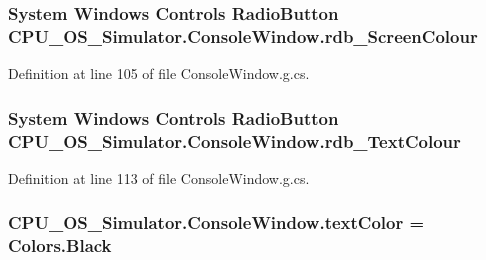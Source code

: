 \subsubsection[{rdb\+\_\+\+Screen\+Colour}]{\setlength{\rightskip}{0pt plus 5cm}System Windows Controls Radio\+Button C\+P\+U\+\_\+\+O\+S\+\_\+\+Simulator.\+Console\+Window.\+rdb\+\_\+\+Screen\+Colour\hspace{0.3cm}{\ttfamily [package]}}\label{class_c_p_u___o_s___simulator_1_1_console_window_a1ce1d3ba71dbca9bee53bf6b9c474787}


Definition at line 105 of file Console\+Window.\+g.\+cs.

\hypertarget{class_c_p_u___o_s___simulator_1_1_console_window_a6086d1a5ddaadd584ec129c7372359e2}{}
\subsubsection[{rdb\+\_\+\+Text\+Colour}]{\setlength{\rightskip}{0pt plus 5cm}System Windows Controls Radio\+Button C\+P\+U\+\_\+\+O\+S\+\_\+\+Simulator.\+Console\+Window.\+rdb\+\_\+\+Text\+Colour\hspace{0.3cm}{\ttfamily [package]}}\label{class_c_p_u___o_s___simulator_1_1_console_window_a6086d1a5ddaadd584ec129c7372359e2}


Definition at line 113 of file Console\+Window.\+g.\+cs.

\hypertarget{class_c_p_u___o_s___simulator_1_1_console_window_a155c42bee25bd537a2656828bdf6f527}{}
\subsubsection[{text\+Color}]{ C\+P\+U\+\_\+\+O\+S\+\_\+\+Simulator.\+Console\+Window.\+text\+Color = Colors.\+Black\hspace{0.3cm}{\ttfamily [private]}}\label{class_c_p_u___o_s___simulator_1_1_console_window_a155c42bee25bd537a2656828bdf6f527}


